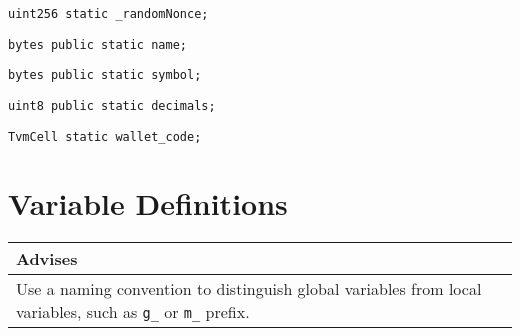 \begin{lstlisting}[firstnumber=28]
    uint256 static _randomNonce;
\end{lstlisting}

\begin{lstlisting}[firstnumber=30]
    bytes public static name;
\end{lstlisting}

\begin{lstlisting}[firstnumber=31]
    bytes public static symbol;
\end{lstlisting}

\begin{lstlisting}[firstnumber=32]
    uint8 public static decimals;
\end{lstlisting}

\begin{lstlisting}[firstnumber=34]
    TvmCell static wallet_code;
\end{lstlisting}

\section{Variable Definitions}


\ifsoldraft
\noindent\begin{tabular}{|p{12cm}|}\hline
\rowcolor{green}Advises
\\\hline
Use a naming convention to distinguish global variables from local variables, such as \verb+g_+ or \verb+m_+ prefix.
\\\hline\end{tabular}
\fi

